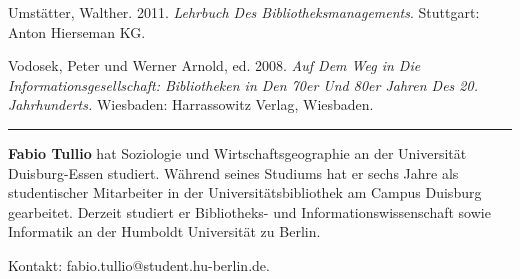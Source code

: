 \documentclass[a4paper,
fontsize=11pt,
oneside,
numbers=noperiodatend,
parskip=half-,
bibliography=totoc,
final
]{scrartcl}
\begin{document}
Umstätter, Walther. 2011. \emph{Lehrbuch Des Bibliotheksmanagements}.
Stuttgart: Anton Hierseman KG.

Vodosek, Peter und Werner Arnold, ed. 2008. \emph{Auf Dem Weg in Die
Informationsgesellschaft: Bibliotheken in Den 70er Und 80er Jahren Des
20. Jahrhunderts.} Wiesbaden: Harrassowitz Verlag, Wiesbaden.


\begin{center}\rule{0.5\linewidth}{\linethickness}\end{center}

\textbf{Fabio Tullio} hat Soziologie und Wirtschaftsgeographie an der
Universität Duisburg-Essen studiert. Während seines Studiums hat er
sechs Jahre als studentischer Mitarbeiter in der Universitätsbibliothek
am Campus Duisburg gearbeitet. Derzeit studiert er Bibliotheks- und
Informationswissenschaft sowie Informatik an der Humboldt Universität zu
Berlin. 

Kontakt: fabio.tullio@student.hu-berlin.de.
\end{document}
